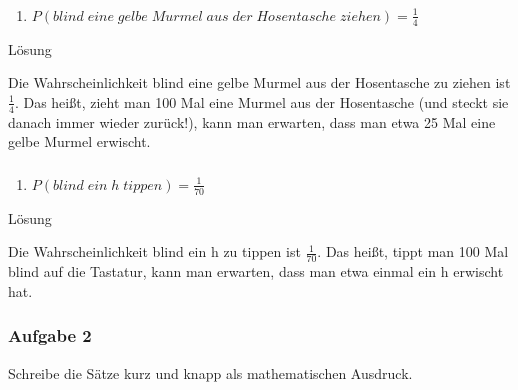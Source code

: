 \documentclass[
  ngerman,
]{book}
\providecommand{\tightlist}{%
  \setlength{\itemsep}{0pt}\setlength{\parskip}{0pt}}
\begin{document}
\hypertarget{section-66}{%
\subsubsection*{}\label{section-66}}

\begin{enumerate}
\def\labelenumi{\alph{enumi})}
\setcounter{enumi}{1}
\tightlist
\item
  \(P(blind\;eine\;gelbe\;Murmel\;aus\;der\;Hosentasche\;ziehen)=\frac{1}{4}\)
\end{enumerate}

Lösung

Die Wahrscheinlichkeit blind eine gelbe Murmel aus der Hosentasche zu ziehen ist \(\frac{1}{4}\). Das heißt, zieht man 100 Mal eine Murmel aus der Hosentasche (und steckt sie danach immer wieder zurück!), kann man erwarten, dass man etwa 25 Mal eine gelbe Murmel erwischt.

\hypertarget{section-67}{%
\subsubsection*{}\label{section-67}}

\begin{enumerate}
\def\labelenumi{\alph{enumi})}
\setcounter{enumi}{2}
\tightlist
\item
  \(P(blind\;ein\;h\;tippen)=\frac{1}{70}\)
\end{enumerate}

Lösung

Die Wahrscheinlichkeit blind ein h zu tippen ist \(\frac{1}{70}\). Das heißt, tippt man 100 Mal blind auf die Tastatur, kann man erwarten, dass man etwa einmal ein h erwischt hat.

\hypertarget{section-68}{%
\subsubsection*{}\label{section-68}}

\hypertarget{aufgabe-2-8}{%
\subsubsection*{Aufgabe 2}\label{aufgabe-2-8}}

Schreibe die Sätze kurz und knapp als mathematischen Ausdruck.
\end{document}
